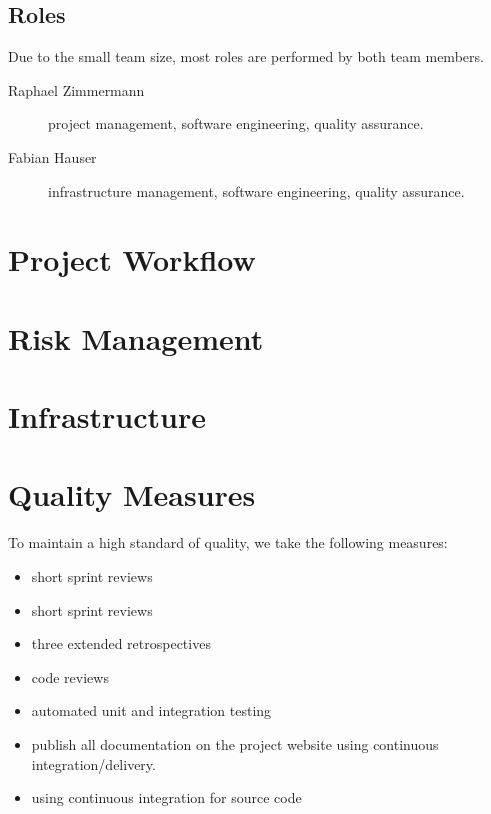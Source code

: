 \documentclass[a4paper]{article}
\begin{document}
\subsection{Roles}

Due to the small team size, most roles are performed by both team members.

\begin{description}
	\item[Raphael Zimmermann] project management, software engineering, quality assurance.
	\item[Fabian Hauser] infrastructure management, software engineering, quality assurance.
\end{description}

\section{Project Workflow}


\section{Risk Management}

\section{Infrastructure}

\section{Quality Measures}
To maintain a high standard of quality, we take the following measures:

\begin{multicols}{2}
	\begin{itemize}
		\item short sprint reviews
	    \item short sprint reviews
	    \item three extended retrospectives
	    \item code reviews
	    \item automated unit and integration testing
	    \item publish all documentation on the project website using continuous integration/delivery.
	    \item using continuous integration for source code
	\end{itemize}
\end{multicols}
\end{document}
